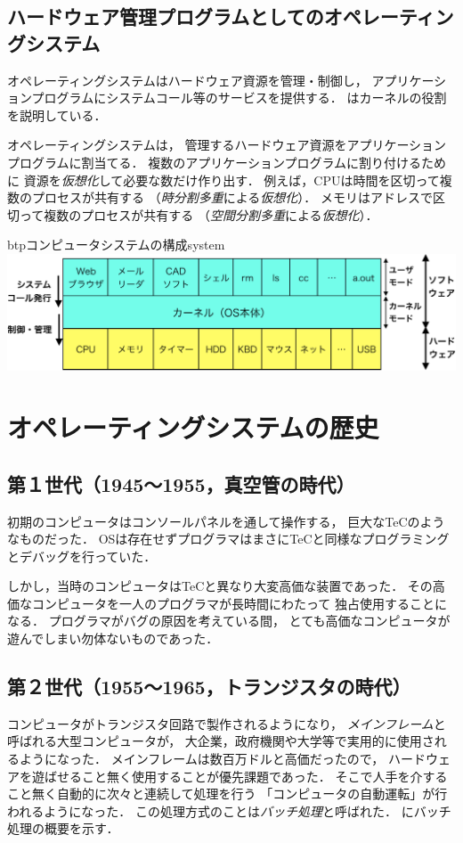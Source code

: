 \subsection{ハードウェア管理プログラムとしてのオペレーティングシステム}
オペレーティングシステムはハードウェア資源を管理・制御し，
アプリケーションプログラムにシステムコール等のサービスを提供する．
はカーネルの役割を説明している．

オペレーティングシステムは，
管理するハードウェア資源をアプリケーションプログラムに割当てる．
複数のアプリケーションプログラムに割り付けるために
資源を\emph{仮想化}して必要な数だけ作り出す．
例えば，CPUは時間を区切って複数のプロセスが共有する
（\emph{時分割多重}による\emph{仮想化}）．
メモリはアドレスで区切って複数のプロセスが共有する
（\emph{空間分割多重}による\emph{仮想化}）．

\begin{myfig}{btp}{コンピュータシステムの構成}{system}
  \includegraphics[scale=0.66]{Fig/system-crop.pdf}
\end{myfig}

\section{オペレーティングシステムの歴史}

\subsection{第１世代（1945〜1955，真空管の時代）}
初期のコンピュータはコンソールパネルを通して操作する，
巨大なTeC\cite{tec}のようなものだった．
OSは存在せずプログラマはまさにTeCと同様なプログラミングとデバッグを行っていた．

しかし，当時のコンピュータはTeCと異なり大変高価な装置であった．
その高価なコンピュータを一人のプログラマが長時間にわたって
独占使用することになる．
プログラマがバグの原因を考えている間，
とても高価なコンピュータが遊んでしまい勿体ないものであった．

\subsection{第２世代（1955〜1965，トランジスタの時代）}
\label{gen2nd}
コンピュータがトランジスタ回路で製作されるようになり，
\emph{メインフレーム}と呼ばれる大型コンピュータが，
大企業，政府機関や大学等で実用的に使用されるようになった．
メインフレームは数百万ドルと高価だったので，
ハードウェアを遊ばせること無く使用することが優先課題であった．
そこで人手を介すること無く自動的に次々と連続して処理を行う
「コンピュータの自動運転」が行われるようになった．
この処理方式のことは\emph{バッチ処理}と呼ばれた．
にバッチ処理の概要を示す．

